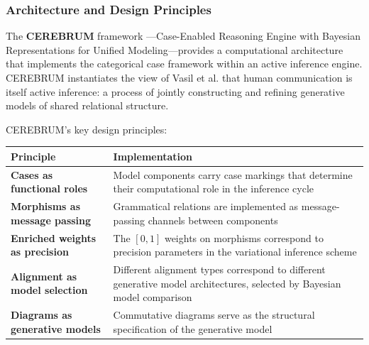 \documentclass[
]{article}
\newcounter{none} %
\numberwithin{equation}{section}
\begin{document}
\subsubsection{Architecture and Design
Principles}\label{architecture-and-design-principles}

The \textbf{CEREBRUM} framework
\citep{friedman2024cerebrum, cerebrum2024github}---Case-Enabled
Reasoning Engine with Bayesian Representations for Unified
Modeling---provides a computational architecture that implements the
categorical case framework within an active inference engine. CEREBRUM
instantiates the view of Vasil et al. \citeyearpar{vasil2020world} that
human communication is itself active inference: a process of jointly
constructing and refining generative models of shared relational
structure.

CEREBRUM's key design principles:

{\def\LTcaptype{none} %
\begin{longtable}[]{@{}
  >{\raggedright\arraybackslash}p{}
  >{\raggedright\arraybackslash}p{}@{}}
\toprule\noalign{}
\begin{minipage}[b]{\linewidth}\raggedright
Principle
\end{minipage} & \begin{minipage}[b]{\linewidth}\raggedright
Implementation
\end{minipage} \\
\midrule\noalign{}
\endhead
\bottomrule\noalign{}
\endlastfoot
\textbf{Cases as functional roles} & Model components carry case
markings that determine their computational role in the inference
cycle \\
\textbf{Morphisms as message passing} & Grammatical relations are
implemented as message-passing channels between components \\
\textbf{Enriched weights as precision} & The \([0,1]\) weights on
morphisms correspond to precision parameters in the variational
inference scheme \\
\textbf{Alignment as model selection} & Different alignment types
correspond to different generative model architectures, selected by
Bayesian model comparison \\
\textbf{Diagrams as generative models} & Commutative diagrams serve as
the structural specification of the generative model \\
\end{longtable}
}
\end{document}
